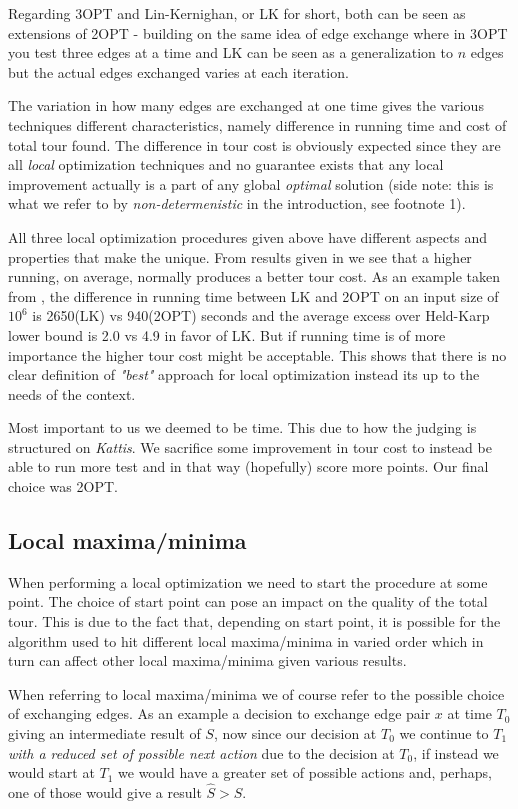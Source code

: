 \documentclass[a4paper,12pt,oneside]{article}
\begin{document}
Regarding 3OPT and Lin-Kernighan, or LK for short, both can be seen as extensions of 2OPT - building on the same idea of edge exchange where in 3OPT you test three edges at a time and LK can be seen as a generalization to $n$ edges but the actual edges exchanged varies at each iteration.

The variation in how many edges are exchanged at one time gives the various techniques different characteristics, namely difference in running time and cost of total tour found. The difference in tour cost is obviously expected since they are all \textit{local} optimization techniques and no guarantee exists that any local improvement actually is a part of any global \textit{optimal} solution (side note: this is what we refer to by \textit{non-determenistic} in the introduction, see footnote 1).

All three local optimization procedures given above have different aspects and properties that make the unique. From results given in \cite{localopt} we see that a higher running, on average, normally produces a better tour cost. As an example taken from \cite{localopt}, the difference in running time between LK and 2OPT on an input size of $10^6$ is 2650(LK) vs 940(2OPT) seconds and the average excess over Held-Karp lower bound is 2.0 vs 4.9 in favor of LK. But if running time is of more importance the higher tour cost might be acceptable. This shows that there is no clear definition of \textit{"best"} approach for local optimization instead its up to the needs of the context. 

Most important to us we deemed to be time. This due to how the judging is structured on \textit{Kattis}\cite{kattis}. We sacrifice some improvement in tour cost to instead be able to run more test and in that way (hopefully) score more points. Our final choice was 2OPT.

\subsection{Local maxima/minima}
When performing a local optimization we need to start the procedure at some point. The choice of start point can pose an impact on the quality of the total tour. This is due to the fact that, depending on start point, it is possible for the algorithm used to hit different local maxima/minima in varied order which in turn can affect other local maxima/minima given various results.

When referring to local maxima/minima we of course refer to the possible choice of exchanging edges. As an example a decision to exchange edge pair $x$ at time $T_0$ giving an intermediate result of $S$, now since our decision at $T_0$ we continue to $T_1$ \textit{with a reduced set of possible next action} due to the decision at $T_0$, if instead we would start at $T_1$ we would have a greater set of possible actions and, perhaps, one of those would give a result $\hat{S} > S$.
\end{document}
